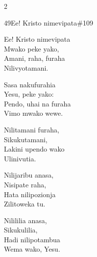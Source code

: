 \begin{multicols}{2}
\begin{hymn}{49}{Ee! Kristo nimevipata}{\#109}
\begin{stanza}
Ee! Kristo nimevipata\\
Mwako peke yako,\\
Amani, raha, furaha\\
Nilivyotamani.
\end{stanza}
\begin{chorus}
Sasa nakufurahia\\
Yesu, peke yako:\\
Pendo, uhai na furaha\\
Vimo mwako wewe.
\end{chorus}
\begin{stanza}
Nilitamani furaha,\\
Sikukutamani,\\
Lakini upendo wako\\
Ulinivutia.
\end{stanza}
\begin{stanza}
Nilijaribu anasa,\\
Nisipate raha,\\
Hata nilipozionja\\
Zilitoweka tu.
\end{stanza}
\begin{stanza}
Nilililia anasa,\\
Sikukulilia,\\
Hadi nilipotambua\\
Wema wako, Yesu.
\end{stanza}
\end{hymn}


\end{multicols}
